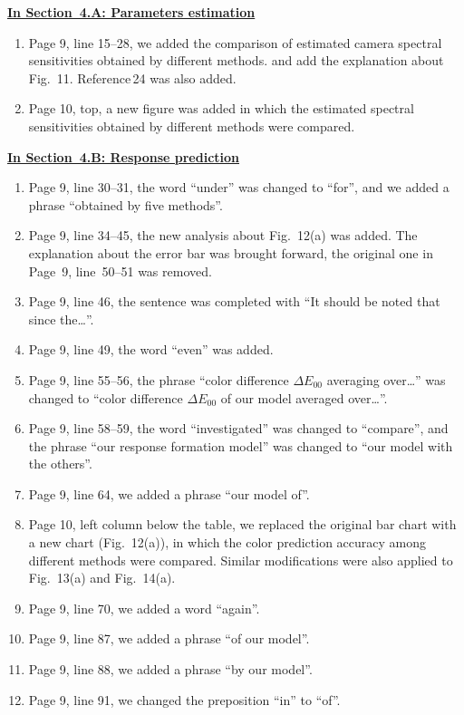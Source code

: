 \documentclass[12pt]{article}
\begin{document}
	\noindent\underline{\textbf{{\large In Section~4.A: Parameters estimation}}}
	
	\begin{enumerate}[resume]
		\item Page 9, line 15--28, we added the comparison of estimated camera spectral sensitivities obtained by different methods. and add the explanation about Fig.~11. Reference\,24 was also added.
		
		\item Page 10, top, a new figure was added in which the estimated spectral sensitivities obtained by different methods were compared.
	\end{enumerate}
	
	\noindent\underline{\textbf{{\large In Section~4.B: Response prediction}}}
	
	\begin{enumerate}[resume]
		\item Page 9, line 30--31, the word ``under'' was changed to ``for'', and we added a phrase ``obtained by five methods''.
		
		\item Page 9, line 34--45, the new analysis about Fig.~12(a) was added. The explanation about the error bar was brought forward, the original one in Page~9, line~50--51 was removed.
		
		\item Page 9, line 46, the sentence was completed with ``It should be noted that since the\ldots''.
		
		\item Page 9, line 49, the word ``even'' was added.
		
		\item Page 9, line 55--56, the phrase ``color difference $\Delta{}E_{00}$ averaging over\ldots'' was changed to ``color difference $\Delta{}E_{00}$ of our model averaged over\ldots''.
		
		\item Page 9, line 58--59, the word ``investigated'' was changed to ``compare'', and the phrase ``our response formation model'' was changed to ``our model with the others''.
		
		\item Page 9, line 64, we added a phrase ``our model of''.
		
		\item Page 10, left column below the table, we replaced the original bar chart with a new chart (Fig.~12(a)), in which the color prediction accuracy among different methods were compared. Similar modifications were also applied to Fig.~13(a) and Fig.~14(a).
		
		\item Page 9, line 70, we added a word ``again''.
		
		\item Page 9, line 87, we added a phrase ``of our model''.
		
		\item Page 9, line 88, we added a phrase ``by our model''.
		
		\item Page 9, line 91, we changed the preposition ``in'' to ``of''.
	\end{enumerate}
	
\end{document}
